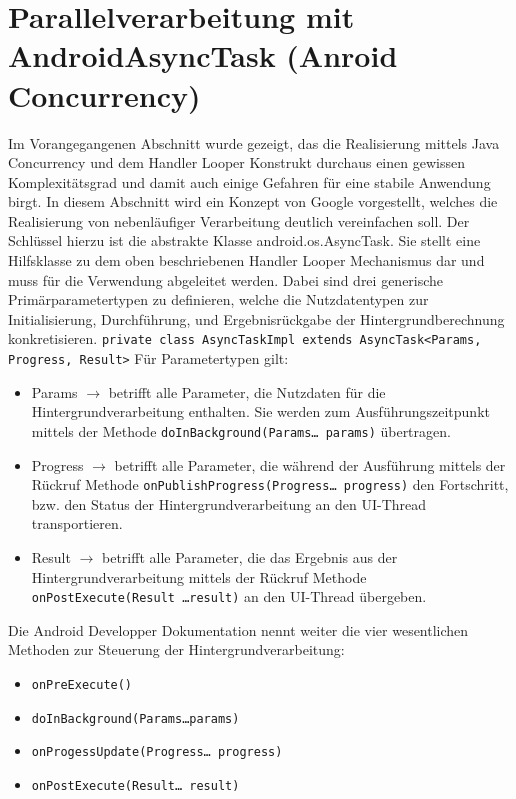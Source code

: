 \documentclass[12pt,oneside,a4paper,bibtotoc,liststotoc]{scrreprt}
\begin{document}
\section{Parallelverarbeitung mit AndroidAsyncTask (Anroid Concurrency)}
Im Vorangegangenen Abschnitt wurde gezeigt, das die Realisierung mittels Java Concurrency und dem Handler Looper Konstrukt durchaus einen gewissen Komplexitätsgrad und damit auch einige Gefahren für eine stabile Anwendung birgt. In diesem Abschnitt wird ein Konzept von Google vorgestellt, welches die Realisierung von nebenläufiger Verarbeitung deutlich vereinfachen soll. Der Schlüssel hierzu ist die abstrakte Klasse android.os.AsyncTask. Sie stellt eine Hilfsklasse zu dem oben beschriebenen Handler Looper Mechanismus dar und muss für die Verwendung abgeleitet werden. Dabei sind drei generische Primärparametertypen zu definieren, welche die  Nutzdatentypen zur Initialisierung, Durchführung, und Ergebnisrückgabe der Hintergrundberechnung konkretisieren.\newline
\newline
\texttt{private class AsyncTaskImpl extends AsyncTask<Params, Progress, Result>}
\newline
Für Parametertypen gilt:
\begin{itemize}
\item Params $\rightarrow$ betrifft alle Parameter, die Nutzdaten für die Hintergrundverarbeitung enthalten. Sie werden zum Ausführungszeitpunkt mittels der Methode \texttt{doInBackground(Params… params)} übertragen.
\item Progress $\rightarrow$ betrifft alle Parameter, die während der Ausführung mittels der Rückruf Methode \texttt{onPublishProgress(Progress… progress)} den Fortschritt, bzw.  den Status der Hintergrundverarbeitung an den UI-Thread transportieren.
\item Result $\rightarrow$ betrifft alle Parameter, die das Ergebnis aus der Hintergrundverarbeitung mittels der Rückruf Methode \texttt{onPostExecute(Result …result)} an den UI-Thread übergeben.
\end{itemize}
Die Android Developper Dokumentation nennt weiter die vier wesentlichen Methoden zur Steuerung der Hintergrundverarbeitung:
\begin{itemize}
\item \texttt{onPreExecute()}
\item \texttt{doInBackground(Params…params)}
\item \texttt{onProgessUpdate(Progress… progress)}
\item \texttt{onPostExecute(Result… result)}
\end{itemize}
\end{document}
